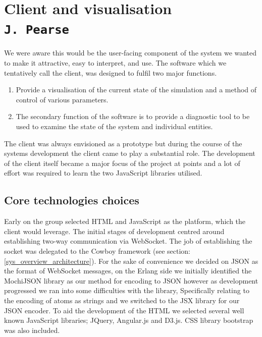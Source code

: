 \pagestyle{empty}
\section{Client and visualisation\\{\small\tt{J.~Pearse}}}
\label{client}
\label{client_doc}
We were aware this would be the user-facing component of the system we wanted to make it attractive, easy to interpret, and use.
The software which we tentatively call the client, was designed to fulfil two major functions.
\begin{enumerate}
  \item{Provide a visualisation of the current state of the simulation and a method of control of various parameters.}
  \item{The secondary function of the software is to provide a diagnostic tool to be used to examine the state of the system and individual entities.}
\end{enumerate}
The client was always envisioned as a prototype but during the course of the systems development the client came to play a substantial role. The development of the client itself became a major focus of the project at points and a lot of effort was required to learn the two JavaScript libraries utilised.
\subsection{Core technologies choices}
Early on the group selected HTML and JavaScript as the platform, which the client would leverage. The initial stages of development centred around establishing two-way communication via WebSocket. The job of establishing the socket was delegated to the Cowboy framework (see section: \ref{sys_overview_architecture}). For the sake of convenience we decided on JSON as the format of WebSocket messages, on the Erlang side we initially identified the MochiJSON library as our method for encoding to JSON however as development progressed we ran into some difficulties with the library, Specifically relating to the encoding of atoms as strings and we switched to the JSX library for our JSON encoder.
To aid the development of the HTML we selected several well known JavaScript libraries; JQuery, Angular.js and D3.js. CSS library bootstrap was also included.
